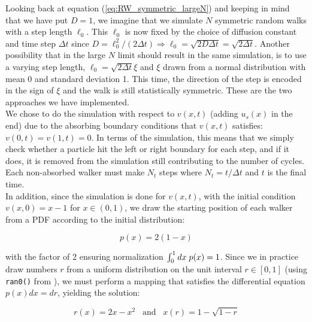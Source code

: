 \documentclass[a4paper, 11pt, notitlepage,english]{article}
\begin{document}
Looking back at equation (\ref{eq:RW_symmetric_largeN}) and keeping in mind that we have put $D = 1$, we imagine that we simulate $N$ symmetric random walks with a step length 
$\ell_0$. This $\ell_0$ is now fixed by the choice of diffusion constant and time step $\Delta t$ since
$D = \ell_0^2/(2\Delta t) \Rightarrow \ell_0 = \sqrt{2D\Delta t} = \sqrt{2\Delta t}$. Another possibility that in the large $N$ limit should result in the same simulation,
is to use a varying step length, $\ell_0 = \sqrt{2\Delta t}\xi$ and $\xi$ drawn from a normal distribution with mean 0 and standard deviation 1. 
This time, the direction of the step is encoded in the sign of $\xi$ and the walk is still statistically symmetric. These are the two approaches we have implemented.\\

We chose to do the simulation with respect to $v(x,t)$ (adding $u_s(x)$ in the end) due to the absorbing boundary conditions  that $v(x,t)$ satisfies: $v(0,t) = v(1,t) = 0$. In terms of the simulation, this means that we simply check whether a particle hit the left or right boundary for
each step, and if it does, it is removed from the simulation still contributing to the number of cycles. Each non-absorbed walker must make $N_t$ steps where $N_t = t/\Delta t$ and $t$ is
the final time. \\

In addition, since the simulation is done for $v(x,t)$, with the initial condition $v(x,0) = x-1$ for $x\in (0,1)$, we draw the starting position of each walker from a PDF according to the initial distribution:

\begin{equation}
p(x) = 2(1-x)
\label{eq:MC_initial_dist}
\end{equation}

with the factor of 2 ensuring normalization $\int_0^1 dx \hspace{1mm} p(x) = 1$. Since we in practice draw numbers $r$ from a uniform distribution on the unit interval $r \in [0,1]$ (using \texttt{ran0()} from \cite{Komp3150}), we must perform a mapping that satisfies the differential equation $p(x)dx = dr$, yielding the solution:

\begin{equation}
r(x) = 2x-x^2 \hspace{10pt} \mathrm{and} \hspace{10pt} x(r) = 1 - \sqrt{1-r}
\label{eq:MC_prob_mapping}
\end{equation}
\end{document}
